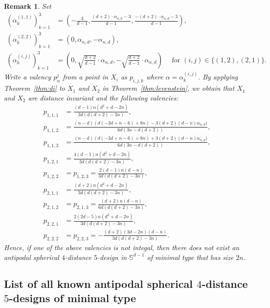 \documentclass[11pt]{article}
\newtheorem{remark}{Remark}[section]
\theoremstyle{definition}
\theoremstyle{remark}
\begin{document}
\begin{remark}
Set 
\begin{align*}
    \left(\alpha_{k}^{(1,1)}\right)_{k=1}^3&=\left(-\frac{3}{d-1},\frac{(d+2)\cdot \alpha_{n,d}-3}{d-1},\frac{-(d+2)\cdot \alpha_{n,d}-3}{d-1}\right),\\
    \left(\alpha_{k}^{(2,2)}\right)_{k=1}^3&=\left(0,\alpha_{n,d},-\alpha_{n,d}\right),\\
    \left(\alpha_{k}^{(i,j)}\right)_{k=1}^3&=\left(0, \sqrt{\frac{d+2}{d-1}}\cdot \alpha_{n,d},- \sqrt{\frac{d+2}{d-1}}\cdot \alpha_{n,d}\right)\quad \text{ for }(i,j)\in\{(1,2),(2,1)\}. 
\end{align*}
Write a valency $p_{\alpha}^j$ from a point in $X_i$ as $p_{i,j,k}$ where $\alpha=\alpha_k^{(i,j)}$.   
By applying Theorem~\ref{thm:di} to $X_1$ and $X_2$ in Theorem~\ref{thm:levenstein}, we obtain that $X_1$ and $X_2$ are distance invariant and the following valencies: 
\begin{align*}
    p_{1,1,1}&=\frac{(d-1) n \left(d^2+d-2 n\right)}{3 d (d (d+2)-3 n)},\\
    p_{1,1,2}&=\frac{(n-d) (d (-3 d+n-6)+8 n)-3 (d+2) (d-n)\alpha_{n,d})}{6 d (3 n-d (d+2))}, \\
    p_{1,1,3}&=\frac{(n-d) (d (-3 d+n-6)+8 n)+3 (d+2)  (d-n)\alpha_{n,d})}{6 d (3 n-d (d+2))},\\
    p_{1,2,1}&=\frac{4 (d-1) n \left(d^2+d-2 n\right)}{3 d (d (d+2)-3 n)},\\
    p_{1,2,2}&=p_{1,2,3}=\frac{2 (d-1) n (d-n)}{3 d (d (d+2)-3 n)},\\
    p_{2,1,1}&=\frac{(d+2) n \left(d^2+d-2 n\right)}{3 d (d (d+2)-3 n)},\\
    p_{2,1,2}&=p_{2,1,3}=\frac{(d+2) n (d-n)}{6 d (d (d+2)-3 n)},\\
    p_{2,2,1}&=\frac{2 (2 d-5) n \left(d^2+d-2 n\right)}{3 d (d (d+2)-3 n)},\\
    p_{2,2,2}&=p_{2,2,3}=-\frac{(d+2) (3 d-2 n) (d-n)}{3 d (d (d+2)-3 n)}.
\end{align*}
Hence, if one of the above valencies is not integal, then there does not exist an antipodal spherical $4$-distance $5$-design in $\mathbb{S}^{d-1}$ of minimal type that has size $2n$. 
\end{remark}	




\subsection{List of all known antipodal spherical $4$-distance $5$-designs of minimal type}
\end{document}
